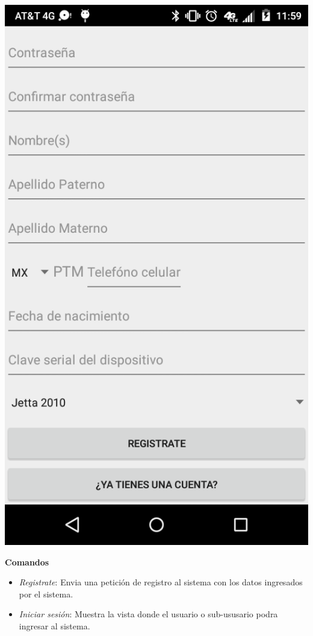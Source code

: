 \begin{center}
      \includegraphics[scale=.2]{Capitulo3/img/gui/IU_Registrarse_(2).png}
      \label{fig:iu05_fig}
    \end{center}
  \textbf{Comandos}
    \begin{itemize}
      \item \textit{Registrate}: Envia una petición de registro al sistema con los datos ingresados por el sistema.
      \item \textit{Iniciar sesión}: Muestra la vista \textbf{} donde el usuario o sub-ususario podra ingresar al sistema.
    \end{itemize}
